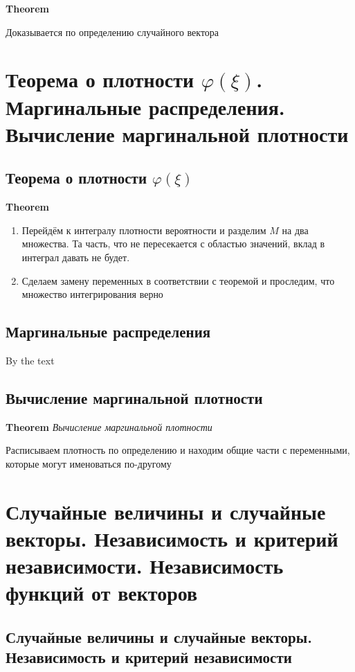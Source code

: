 \documentclass[a4paper, 14pt]{article}
\begin{document}
    \textbf{Theorem}
    
    Доказывается по определению случайного вектора
    
    \section{Теорема о плотности $\varphi(\xi)$.
    Маргинальные распределения.
    Вычисление маргинальной плотности}
    
    \subsection{Теорема о плотности $\varphi(\xi)$}
    
    \textbf{Theorem}
    
    \begin{enumerate}
        \item Перейдём к интегралу плотности вероятности и разделим $M$ на два множества.
        Та часть, что не пересекается с областью значений, вклад в интеграл давать не будет.
        \item Сделаем замену переменных в соответствии с теоремой и проследим, что множество интегрирования верно
    \end{enumerate}
    
    \subsection{Маргинальные распределения}
    
    By the text
    
    \subsection{Вычисление маргинальной плотности}
    
    \textbf{Theorem} \textit{Вычисление маргинальной плотности}
    
    Расписываем плотность по определению и находим общие части с переменными, которые могут именоваться по-другому
    
    \section{Случайные величины и случайные векторы.
    Независимость и критерий независимости.
    Независимость функций от векторов}
    
    \subsection{Случайные величины и случайные векторы. Независимость и критерий независимости}
    
\end{document}

